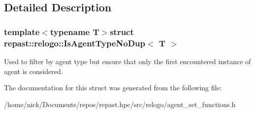 \subsection{Detailed Description}
\subsubsection*{template$<$typename T$>$struct repast\-::relogo\-::\-Is\-Agent\-Type\-No\-Dup$<$ T $>$}

Used to filter by agent type but ensure that only the first encountered instance of agent is considered. 

The documentation for this struct was generated from the following file\-:\begin{DoxyCompactItemize}
\item 
/home/nick/\-Documents/repos/repast.\-hpc/src/relogo/agent\-\_\-set\-\_\-functions.\-h\end{DoxyCompactItemize}
